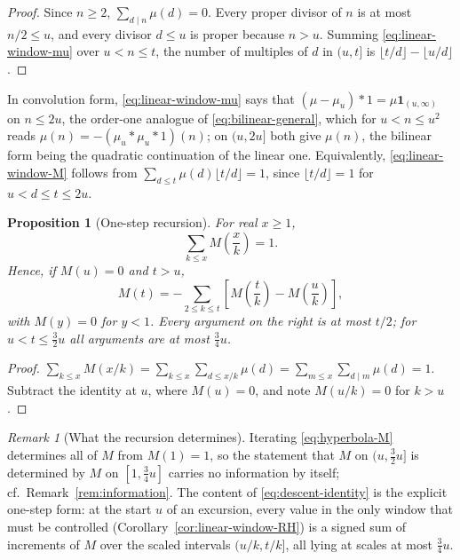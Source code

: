 \documentclass[11pt]{amsart}
\numberwithin{equation}{section}
\theoremstyle{plain}
\newtheorem{proposition}[theorem]{Proposition}
\theoremstyle{definition}
\theoremstyle{remark}
\newtheorem{remark}[theorem]{Remark}
\begin{document}
\begin{proof}
Since $n\ge2$, $\sum_{d\mid n}\mu(d)=0$. Every proper divisor of $n$ is at
most $n/2\le u$, and every divisor $d\le u$ is proper because $n>u$. Summing
\eqref{eq:linear-window-mu} over $u<n\le t$, the number of multiples of $d$
in $(u,t]$ is $\lfloor t/d\rfloor-\lfloor u/d\rfloor$.
\end{proof}

In convolution form, \eqref{eq:linear-window-mu} says that
$(\mu-\mu_u)*1=\mu\mathbf 1_{(u,\infty)}$ on $n\le2u$, the order-one analogue
of \eqref{eq:bilinear-general}, which for $u<n\le u^2$ reads
$\mu(n)=-(\mu_u*\mu_u*1)(n)$; on $(u,2u]$ both give $\mu(n)$, the
bilinear form being the quadratic continuation of the linear one. Equivalently, \eqref{eq:linear-window-M}
follows from $\sum_{d\le t}\mu(d)\lfloor t/d\rfloor=1$, since
$\lfloor t/d\rfloor=1$ for $u<d\le t\le2u$.

\begin{proposition}[One-step recursion]
\label{prop:one-step}
For real $x\ge1$,
\begin{equation}
\label{eq:hyperbola-M}
\sum_{k\le x}M\!\left(\frac xk\right)=1 .
\end{equation}
Hence, if $M(u)=0$ and $t>u$,
\begin{equation}
\label{eq:descent-identity}
M(t)=-\sum_{2\le k\le t}\left[M\!\left(\frac tk\right)-M\!\left(\frac uk\right)\right],
\end{equation}
with $M(y)=0$ for $y<1$. Every argument on the right is at most $t/2$; for
$u<t\le\frac32u$ all arguments are at most $\frac34u$.
\end{proposition}

\begin{proof}
$\sum_{k\le x}M(x/k)=\sum_{k\le x}\sum_{d\le x/k}\mu(d)
=\sum_{m\le x}\sum_{d\mid m}\mu(d)=1$. Subtract the identity at $u$, where
$M(u)=0$, and note $M(u/k)=0$ for $k>u$.
\end{proof}

\begin{remark}[What the recursion determines]
\label{rem:recursion-content}
Iterating \eqref{eq:hyperbola-M} determines all of $M$ from $M(1)=1$, so
the statement that $M$ on $(u,\frac32u]$ is determined by $M$ on
$[1,\frac34u]$ carries no information by itself; cf.\
Remark~\ref{rem:information}. The content of
\eqref{eq:descent-identity} is the explicit one-step form: at the start $u$
of an excursion, every value in the only window that must be controlled
(Corollary~\ref{cor:linear-window-RH}) is a signed sum of increments of $M$
over the scaled intervals $(u/k,t/k]$, all lying at scales at most
$\frac34u$.
\end{remark}
\end{document}
